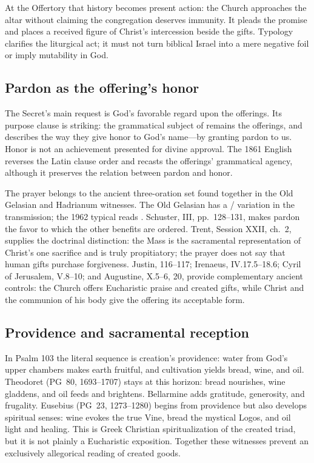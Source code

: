 At the Offertory that history becomes present action: the Church approaches
the altar without claiming the congregation deserves immunity. It pleads the
promise and places a received figure of Christ's intercession beside the gifts.
Typology clarifies the liturgical act; it must not turn biblical Israel into a
mere negative foil or imply mutability in God.

\elementguard
\subsection*{Pardon as the offering's honor }

The Secret's main request is God's favorable regard upon the offerings. Its
purpose clause is striking: the grammatical subject of  remains
the offerings, and  describes the way they
give honor to God's name---by granting pardon to us. Honor is not an
achievement presented for divine approval. The 1861 English reverses the
Latin clause order and recasts the offerings' grammatical agency, although it
preserves the relation between pardon and honor.

The prayer belongs to the ancient three-oration set found together in the Old
Gelasian and Hadrianum witnesses. The Old Gelasian has a
/ variation in the transmission; the 1962
typical reads . Schuster,  III,
pp.~128--131, makes pardon the favor to which the other benefits are ordered.
Trent, Session XXII, ch.~2, supplies the doctrinal distinction: the Mass is
the sacramental representation of Christ's one sacrifice and is truly
propitiatory; the prayer does not say that human gifts purchase forgiveness.
Justin,  116--117; Irenaeus,  IV.17.5--18.6; Cyril of Jerusalem, 
V.8--10; and Augustine,  X.5--6, 20, provide complementary
ancient controls: the Church offers Eucharistic praise and created gifts, while
Christ and the communion of his body give the offering its acceptable form.

\elementguard
\subsection*{Providence and sacramental reception }

In Psalm 103 the literal sequence is creation's providence: water from God's
upper chambers makes earth fruitful, and cultivation yields bread, wine, and
oil. Theodoret (PG~80, 1693--1707) stays at this horizon: bread nourishes,
wine gladdens, and oil feeds and brightens. Bellarmine adds gratitude,
generosity, and frugality. Eusebius (PG~23, 1273--1280) begins from providence
but also develops spiritual senses: wine evokes the true Vine, bread the
mystical Logos, and oil light and healing. This is Greek Christian
spiritualization of the created triad, but it is not plainly a Eucharistic
exposition. Together these witnesses prevent an exclusively allegorical
reading of created goods.

